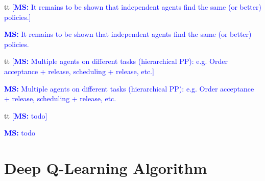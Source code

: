 \documentclass[envcountsame]{llncs}
\newcommand\MS[2][r]{\ifx t#1 \textcolor{blue}{[\textbf{MS:} #2]}
  \else \begin{center}\textcolor{blue}{\textbf{MS:} #2} \end{center} \fi}
\begin{document}


\MS[t]{It remains to be shown that independent agents find the same (or better) policies.}

\MS[t]{Multiple agents on different tasks (hierarchical PP): e.g. Order acceptance + release,
  scheduling + release, etc.}


\MS[t]{todo}



\vfill
\pagebreak[4!]
\appendix

\section{Deep Q-Learning Algorithm}
\end{document}
